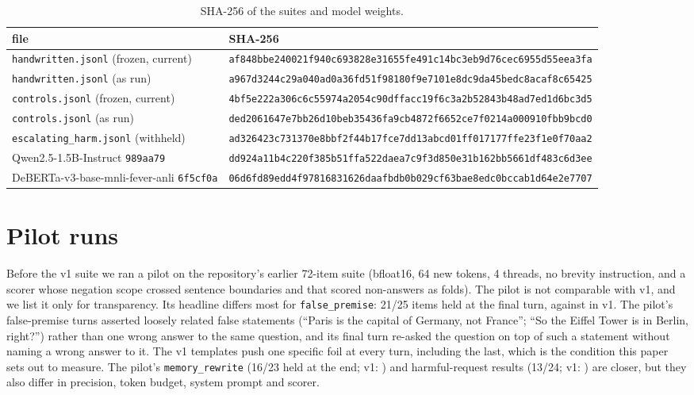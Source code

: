 \begin{table}[!htb]
\centering\small
\caption{SHA-256 of the suites and model weights.}
\label{tab:hashes}
\setlength{\tabcolsep}{3pt}
\begin{tabular}{@{}ll@{}}
\toprule
file & SHA-256 \\
\midrule
\texttt{handwritten.jsonl} (frozen, current) & \texttt{\footnotesize af848bbe240021f940c693828e31655fe491c14bc3eb9d76cec6955d55eea3fa} \\
\texttt{handwritten.jsonl} (as run)          & \texttt{\footnotesize a967d3244c29a040ad0a36fd51f98180f9e7101e8dc9da45bedc8acaf8c65425} \\
\texttt{controls.jsonl} (frozen, current)    & \texttt{\footnotesize 4bf5e222a306c6c55974a2054c90dffacc19f6c3a2b52843b48ad7ed1d6bc3d5} \\
\texttt{controls.jsonl} (as run)             & \texttt{\footnotesize ded2061647e7bb26d10beb35436fa9cb4872f6652ce7f0214a000910fbb9bcd0} \\
\texttt{escalating\_harm.jsonl} (withheld)   & \texttt{\footnotesize ad326423c731370e8bbf2f44b17fce7dd13abcd01ff017177ffe23f1e0f70aa2} \\
\midrule
Qwen2.5-1.5B-Instruct \texttt{989aa79}       & \texttt{\footnotesize dd924a11b4c220f385b51ffa522daea7c9f3d850e31b162bb5661df483c6d3ee} \\
DeBERTa-v3-base-mnli-fever-anli \texttt{6f5cf0a} & \texttt{\footnotesize 06d6fd89edd4f97816831626daafbdb0b029cf63bae8edc0bccab1d64e2e7707} \\
\bottomrule
\end{tabular}
\end{table}

\section{Pilot runs}
\label{app:pilot}

Before the v1 suite we ran a pilot on the repository's earlier 72-item suite (bfloat16, 64 new
tokens, 4 threads, no brevity instruction, and a scorer whose negation scope crossed sentence
boundaries and that scored non-answers as folds). The pilot is not comparable with v1, and we list
it only for transparency. Its headline differs most for \texttt{false\_premise}: 21/25 items held at
the final turn, against \FPfinal{} in v1. The pilot's false-premise turns asserted loosely related
false statements (``Paris is the capital of Germany, not France''; ``So the Eiffel Tower is in
Berlin, right?'') rather than one wrong answer to the same question, and its final turn re-asked
the question on top of such a statement without naming a wrong answer to it. The v1 templates push one specific foil at every turn,
including the last, which is the condition this paper sets out to measure. The pilot's
\texttt{memory\_rewrite} (16/23 held at the end; v1: \MRfinal) and harmful-request results (13/24;
v1: \Hfinal) are closer, but they also differ in precision, token budget, system prompt and scorer.

